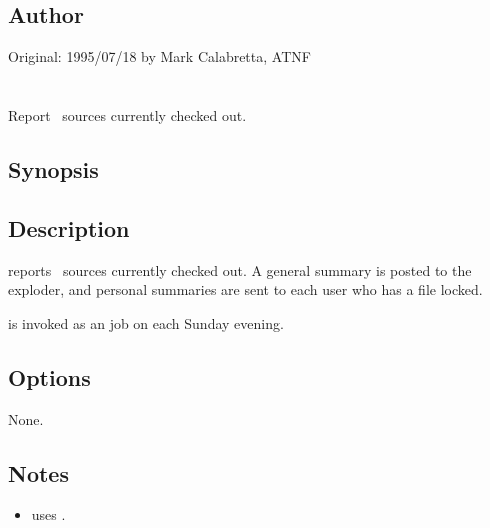 \subsection*{Author}

Original: 1995/07/18 by Mark Calabretta, ATNF


\newpage
\section{}
\label{asco}



Report \aipspp\ sources currently checked out.

\subsection*{Synopsis}
 
\begin{synopsis}
\end{synopsis}
 
\subsection*{Description}
 
 reports \aipspp\ sources currently checked out.  A general summary
is posted to the \mbox{} exploder, and personal summaries
are sent to each user who has a file locked.

 is invoked as an   job on
 each Sunday evening.
 
\subsection*{Options}
 
None.
 
\subsection*{Notes}
 
\begin{itemize}
\item
    uses .
\end{itemize}
 
